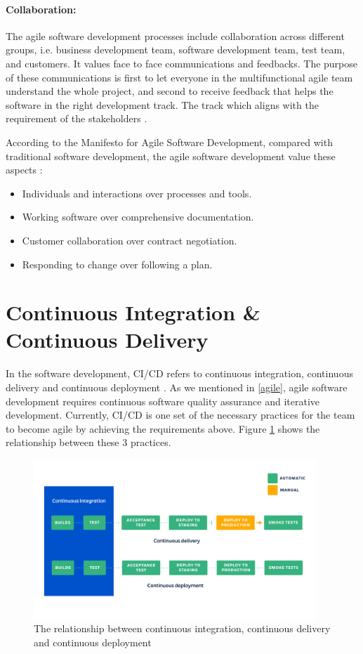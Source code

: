 \paragraph{Collaboration:}
The agile software development processes include collaboration across different groups, i.e. business development team, software development team, test team, and customers. It values face to face communications \cite{beck2001principles} and feedbacks. The purpose of these communications is first to let everyone in the multifunctional agile team understand the whole project, and second to receive feedback that helps the software in the right development track. The track which aligns with the requirement of the stakeholders \cite{beck2001manifesto}. 
\par
According to the Manifesto for Agile Software Development, compared with traditional software development, the agile software development value these aspects \cite{beck2001manifesto}: 
\begin{itemize}
\item Individuals and interactions over processes and tools.
\item Working software over comprehensive documentation.
\item Customer collaboration over contract negotiation.
\item Responding to change over following a plan.
\end{itemize}
\section{Continuous Integration \& Continuous Delivery}
In the software development, CI/CD refers to continuous integration, continuous delivery and continuous deployment \cite{pittet2018continuous}. As we mentioned in \ref{agile}, agile software development requires continuous software quality assurance and iterative development. Currently, CI/CD is one set of the necessary practices for the team to become agile by achieving the requirements above. Figure \ref{fig:cicd} shows the relationship between these 3 practices.
\begin{figure}[h]
    \centering
    \includegraphics[width=0.95\textwidth]{pics/cicd.png}
    \caption{The relationship between continuous integration, continuous delivery and continuous deployment \cite{pittet2018continuous}}
    \label{fig:cicd}
\end{figure}
